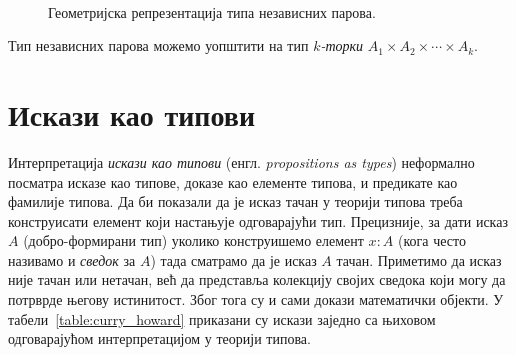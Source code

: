 \documentclass[12pt,oneside]{memoir}
\begin{document}
\begin{figure}[!ht]
    \centering\
    \label{fig:geo_prod}
    \caption{Геометријска репрезентација типа независних парова.}
\end{figure}

Тип независних парова можемо уопштити на тип \emph{$k$-торки} $A_1 \times A_2 \times \cdots \times A_k$.

\section{Искази као типови}
\label{sec:prop-as-types}

Интерпретација \emph{искази као типови} (енгл. \emph{propositions as types}) неформално посматра исказе као типове, доказе као елементе типова, и предикате као фамилије типова. Да би показали да је исказ тачан у теорији типова треба конструисати елемент који настањује одговарајући тип. Прецизније, за дати исказ $A$ (добро-формирани тип) уколико конструишемо елемент $x : A$ (кога често називамо и \emph{сведок} за $A$) тада сматрамо да је исказ $A$ тачан. Приметимо да исказ није тачан или нетачан, већ да представља колекцију својих сведока који могу да потрврде његову истинитост. Због тога су и сами докази математички објекти. У табели~\ref{table:curry_howard} приказани су искази заједно са њиховом одговарајућом интерпретацијом у теорији типова.
\end{document}
